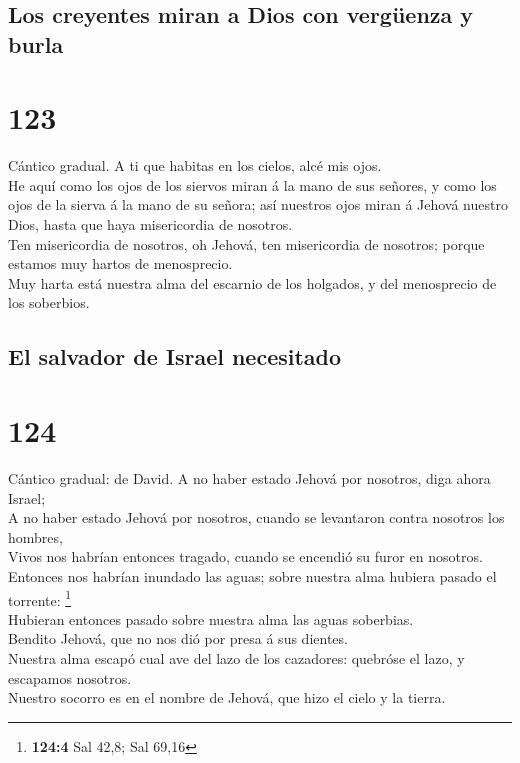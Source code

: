 \hypertarget{los-creyentes-miran-a-dios-con-verguxfcenza-y-burla}{%
\subsection{Los creyentes miran a Dios con vergüenza y
burla}\label{los-creyentes-miran-a-dios-con-verguxfcenza-y-burla}}

\hypertarget{section-122}{%
\section{123}\label{section-122}}

 Cántico gradual. A ti que habitas en los cielos, alcé mis
ojos.\\
 He aquí como los ojos de los siervos miran á la mano de
sus señores, y como los ojos de la sierva á la mano de su señora; así
nuestros ojos miran á Jehová nuestro Dios, hasta que haya misericordia
de nosotros.\\
 Ten misericordia de nosotros, oh Jehová, ten misericordia
de nosotros; porque estamos muy hartos de menosprecio.\\
 Muy harta está nuestra alma del escarnio de los holgados,
y del menosprecio de los soberbios.

\hypertarget{el-salvador-de-israel-necesitado}{%
\subsection{El salvador de Israel
necesitado}\label{el-salvador-de-israel-necesitado}}

\hypertarget{section-123}{%
\section{124}\label{section-123}}

 Cántico gradual: de David. A no haber estado Jehová por
nosotros, diga ahora Israel;\\
 A no haber estado Jehová por nosotros, cuando se
levantaron contra nosotros los hombres,\\
 Vivos nos habrían entonces tragado, cuando se encendió su
furor en nosotros.\\
 Entonces nos habrían inundado las aguas; sobre nuestra
alma hubiera pasado el torrente: \footnote{\textbf{124:4} Sal 42,8; Sal
  69,16}\\
 Hubieran entonces pasado sobre nuestra alma las aguas
soberbias.\\
 Bendito Jehová, que no nos dió por presa á sus dientes.\\
 Nuestra alma escapó cual ave del lazo de los cazadores:
quebróse el lazo, y escapamos nosotros.\\
 Nuestro socorro es en el nombre de Jehová, que hizo el
cielo y la tierra.

